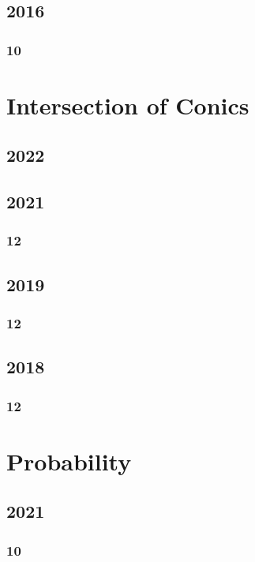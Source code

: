 \documentclass[11pt]{book}
\begin{document}
\section{2016}
\subsection{10}





\chapter{Intersection of Conics}
\section{2022}

\section{2021}
\subsection{12}

\section{2019}
\subsection{12}


\section{2018}
\subsection{12}







\chapter{Probability}
\section{2021}
\subsection{10}

\end{document}

